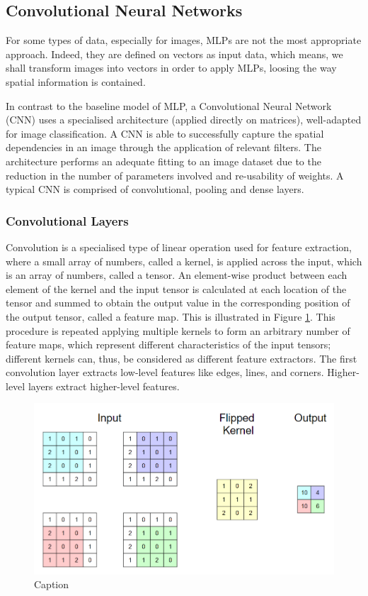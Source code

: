 \subsection{Convolutional Neural Networks}

For some types of data, especially for images, MLPs are not the most appropriate approach. Indeed, they are defined on vectors as input data, which means, we shall transform images into vectors in order to apply MLPs, loosing the way spatial information is contained. \smallskip

In contrast to the baseline model of MLP, a Convolutional Neural Network (CNN) uses a specialised architecture (applied directly on matrices), well-adapted for image classification. A CNN is able to successfully capture the spatial dependencies in an image through the application of relevant filters. The architecture performs an adequate fitting to an image dataset due to the reduction in the number of parameters involved and re-usability of weights. A typical CNN is comprised of convolutional, pooling and dense layers. \\

\subsubsection*{Convolutional Layers}

Convolution is a specialised type of linear operation used for feature extraction, where a small array of numbers, called a kernel, is applied across the input, which is an array of numbers, called a tensor. An element-wise product between each element of the kernel and the input tensor is calculated at each location of the tensor and summed to obtain the output value in the corresponding position of the output tensor, called a feature map. This is illustrated in Figure \ref{Convolution}. This procedure is repeated applying multiple kernels to form an arbitrary number of feature maps, which represent different characteristics of the input tensors; different kernels can, thus, be considered as different feature extractors. The first convolution layer extracts low-level features like edges, lines, and corners. Higher-level layers extract higher-level features. \\

\begin{figure}[H]
  \centering
  \includegraphics[scale = 0.6]{Images/convolution.png}
  \caption{Caption}
  \label{Convolution}
\end{figure}

